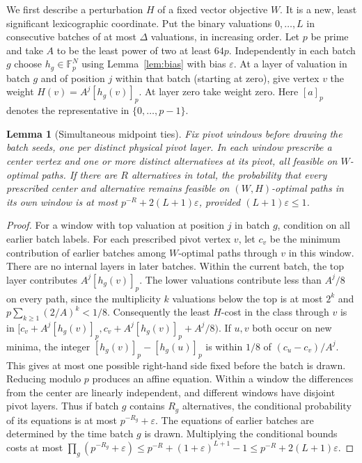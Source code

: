 \documentclass[11pt]{article}
\newtheorem{lemma}[theorem]{Lemma}
\newcommand{\F}{\mathbb F}
\begin{document}
We first describe a perturbation $H$ of a fixed vector objective $W$.
It is a new, least significant lexicographic coordinate. Put the binary
valuations $0,\ldots,L$ in consecutive batches of at most $\Delta$
valuations, in increasing order. Let $p$ be prime and take $A$ to be
the least power of two at least $64p$. Independently in each batch $g$
choose $h_g\in\F_p^N$ using Lemma~\ref{lem:bias} with bias
$\varepsilon$. At a layer of valuation in batch $g$ and of position
$j$ within that batch (starting at zero), give vertex $v$ the weight
$H(v)=A^j[h_g(v)]_p$. At layer zero take weight zero.
Here $[a]_p$ denotes the representative in $\{0,\ldots,p-1\}$.

\begin{lemma}[Simultaneous midpoint ties]\label{lem:ties}
Fix pivot windows before drawing the batch seeds, one per distinct
physical pivot layer. In each window prescribe a center vertex and
one or more distinct alternatives at its pivot, all feasible on
$W$-optimal paths. If there are $R$ alternatives in total, the
probability that every prescribed center and alternative remains
feasible on $(W,H)$-optimal paths in its own window is at most
$p^{-R}+2(L+1)\varepsilon$, provided $(L+1)\varepsilon\le 1$.
\end{lemma}

\begin{proof}
For a window with top valuation at position $j$ in batch $g$, condition
on all earlier batch labels. For each prescribed pivot vertex $v$, let
$c_v$ be the minimum contribution of earlier batches among $W$-optimal
paths through $v$ in this window. There are no internal layers in later
batches. Within the current batch, the top layer contributes
$A^j[h_g(v)]_p$. The lower valuations contribute less than $A^j/8$
on every path, since the multiplicity $k$ valuations below the top
is at most $2^k$ and $p\sum_{k\ge1}(2/A)^k<1/8$. Consequently the
least $H$-cost in the class through $v$ is in
$[c_v+A^j[h_g(v)]_p,c_v+A^j[h_g(v)]_p+A^j/8)$.
If $u,v$ both occur on new minima, the integer
$[h_g(v)]_p-[h_g(u)]_p$ is within $1/8$ of $(c_u-c_v)/A^j$.
This gives at most one possible right-hand side fixed before the batch
is drawn. Reducing modulo $p$ produces an affine equation.
Within a window the differences from the center are linearly
independent, and different windows have disjoint pivot layers.
Thus if batch $g$ contains $R_g$ alternatives, the conditional
probability of its equations is at most $p^{-R_g}+\varepsilon$.
The equations of earlier batches are determined by the time batch $g$
is drawn. Multiplying the conditional bounds costs at most
$\prod_g(p^{-R_g}+\varepsilon)\le p^{-R}+(1+\varepsilon)^{L+1}-1
\le p^{-R}+2(L+1)\varepsilon$.
\end{proof}
\end{document}
